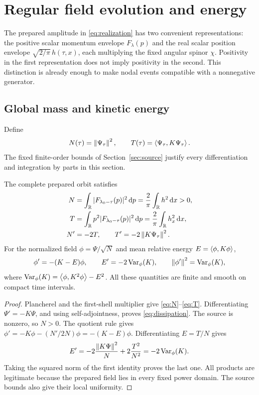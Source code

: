 \section{Regular field evolution and energy}\label{sec:energy}

The prepared amplitude in \eqref{eq:realization} has two convenient
representations: the positive scalar momentum envelope \(F_\lambda(p)\)
and the real scalar position envelope \(\sqrt{2/\pi}\,h(\tau,x)\),
each multiplying the fixed angular spinor \(\chi\).
Positivity in the first representation does not imply positivity in the
second. This distinction is already enough to make nodal events
compatible with a nonnegative generator.

\subsection{Global mass and kinetic energy}
Define
\[
 N(\tau)=\left\lVert\Psi_\tau\right\rVert^2,\qquad
 T(\tau)=\left\langle\Psi_\tau,K\Psi_\tau\right\rangle.
\]
The fixed finite-order bounds of Section~\ref{sec:source} justify every
differentiation and integration by parts in this section.

\begin{proposition}\label{prop:global-energy}
The complete prepared orbit satisfies
\begin{align}
 N&=\int_\mathbb R |F_{\lambda_0-\tau}(p)|^2\,\mathrm d p
   =\frac2\pi\int_\mathbb R h^2\,\mathrm d x>0,\label{eq:N}\\
 T&=\int_\mathbb R p^2|F_{\lambda_0-\tau}(p)|^2\,\mathrm d p
   =\frac2\pi\int_\mathbb R h_x^2\,\mathrm d x,\label{eq:T}\\
 N'&=-2T,\qquad T'=-2\left\lVert K\Psi_\tau\right\rVert^2.\label{eq:dissipation}
\end{align}
For the normalized field \(\phi=\Psi/\sqrt N\) and mean relative
energy \(E=\left\langle\phi,K\phi\right\rangle\),
\begin{equation}\label{eq:normalized}
 \phi'=-(K-E)\phi,\qquad
 E'=-2\operatorname{Var}_\phi(K),\qquad
 \left\lVert\phi'\right\rVert^2=\operatorname{Var}_\phi(K),
\end{equation}
where \(\operatorname{Var}_\phi(K)=\left\langle\phi,K^2\phi\right\rangle-E^2\).
All these quantities are finite and smooth on compact time intervals.
\end{proposition}
\begin{proof}
Plancherel and the first-shell multiplier give \eqref{eq:N}--\eqref{eq:T}.
Differentiating \(\Psi'=-K\Psi\), and using self-adjointness, proves
\eqref{eq:dissipation}. The source is nonzero, so \(N>0\).
The quotient rule gives
\(\phi'=-K\phi-(N'/2N)\phi=-(K-E)\phi\).
Differentiating \(E=T/N\) gives
\[
 E'=-2\frac{\left\lVert K\Psi\right\rVert^2}{N}+2\frac{T^2}{N^2}
    =-2\operatorname{Var}_\phi(K).
\]
Taking the squared norm of the first identity proves the last one.
All products are legitimate because the prepared field lies in every
fixed power domain. The source bounds also give their local uniformity.
\end{proof}

